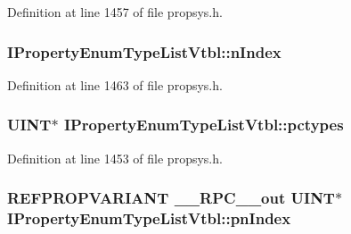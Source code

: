 Definition at line 1457 of file propsys.\+h.

\subsubsection[{\texorpdfstring{n\+Index}{nIndex}}]{ I\+Property\+Enum\+Type\+List\+Vtbl\+::n\+Index}\hypertarget{struct_i_property_enum_type_list_vtbl_adace1e8e7cd794d4f1f2d17ba1718a66}{}\label{struct_i_property_enum_type_list_vtbl_adace1e8e7cd794d4f1f2d17ba1718a66}


Definition at line 1463 of file propsys.\+h.

\subsubsection[{\texorpdfstring{pctypes}{pctypes}}]{ {\bf U\+I\+NT}$\ast$ I\+Property\+Enum\+Type\+List\+Vtbl\+::pctypes}\hypertarget{struct_i_property_enum_type_list_vtbl_a089fa6269a6ef7b0a120f1b889911e6c}{}\label{struct_i_property_enum_type_list_vtbl_a089fa6269a6ef7b0a120f1b889911e6c}


Definition at line 1453 of file propsys.\+h.

\subsubsection[{\texorpdfstring{pn\+Index}{pnIndex}}]{ {\bf R\+E\+F\+P\+R\+O\+P\+V\+A\+R\+I\+A\+NT} {\bf \+\_\+\+\_\+\+R\+P\+C\+\_\+\+\_\+out} {\bf U\+I\+NT}$\ast$ I\+Property\+Enum\+Type\+List\+Vtbl\+::pn\+Index}\hypertarget{struct_i_property_enum_type_list_vtbl_a0e7c684f6530829a56152a3490cb84b3}{}\label{struct_i_property_enum_type_list_vtbl_a0e7c684f6530829a56152a3490cb84b3}


